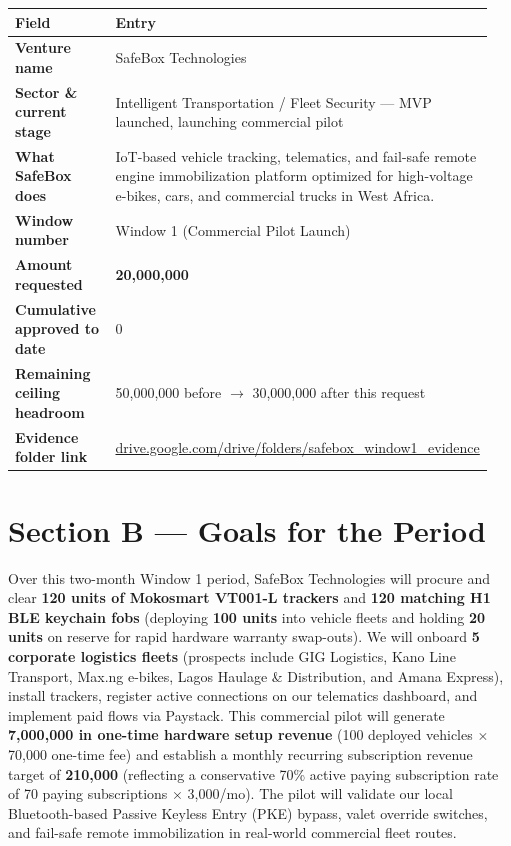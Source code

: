 \documentclass[11pt,a4paper]{article}
\begin{document}
\renewcommand{\arraystretch}{1.3}
\begin{longtable}{p{0.3\linewidth} p{0.65\linewidth}}
    \toprule
    \textbf{Field} & \textbf{Entry} \\
    \midrule
    \textbf{Venture name} & SafeBox Technologies \\
    \textbf{Sector \& current stage} & Intelligent Transportation / Fleet Security --- MVP launched, launching commercial pilot \\
    \textbf{What SafeBox does} & IoT-based vehicle tracking, telematics, and fail-safe remote engine immobilization platform optimized for high-voltage e-bikes, cars, and commercial trucks in West Africa. \\
    \textbf{Window number} & Window 1 (Commercial Pilot Launch) \\
    \textbf{Amount requested} & \textbf{\text{₦}20,000,000} \\
    \textbf{Cumulative approved to date} & \text{₦}0 \\
    \textbf{Remaining ceiling headroom} & \text{₦}50,000,000 before $\rightarrow$ \text{₦}30,000,000 after this request \\
    \textbf{Evidence folder link} & \href{https://drive.google.com/drive/folders/safebox_window1_evidence}{drive.google.com/drive/folders/safebox\_window1\_evidence} \\
    \bottomrule
\end{longtable}

\vspace{0.3cm}

\section{Section B --- Goals for the Period}
Over this two-month Window 1 period, SafeBox Technologies will procure and clear \textbf{120 units of Mokosmart VT001-L trackers} and \textbf{120 matching H1 BLE keychain fobs} (deploying \textbf{100 units} into vehicle fleets and holding \textbf{20 units} on reserve for rapid hardware warranty swap-outs). We will onboard \textbf{5 corporate logistics fleets} (prospects include GIG Logistics, Kano Line Transport, Max.ng e-bikes, Lagos Haulage \& Distribution, and Amana Express), install trackers, register active connections on our telematics dashboard, and implement paid flows via Paystack. This commercial pilot will generate \textbf{7,000,000 in one-time hardware setup revenue} (100 deployed vehicles $\times$ 70,000 one-time fee) and establish a monthly recurring subscription revenue target of \textbf{210,000} (reflecting a conservative 70\% active paying subscription rate of 70 paying subscriptions $\times$ 3,000/mo). The pilot will validate our local Bluetooth-based Passive Keyless Entry (PKE) bypass, valet override switches, and fail-safe remote immobilization in real-world commercial fleet routes.
\end{document}

